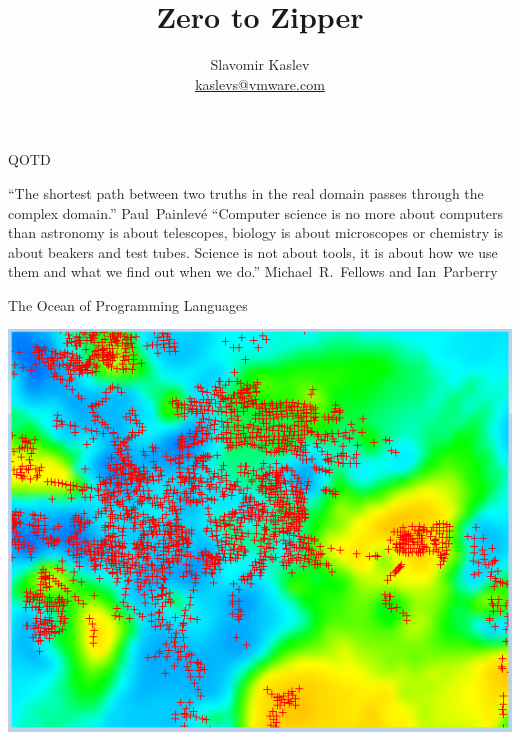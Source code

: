\documentclass[pdf]{beamer}
\title{Zero to Zipper}
\author{Slavomir Kaslev \\
  \href{mailto:kaslevs@vmware.com}{kaslevs@vmware.com}}
\begin{document}
\begin{frame}
  \titlepage
\end{frame}

\begin{frame}{QOTD}
  \begin{outline}
    \1 ``The shortest path between two truths in the real domain passes through the complex domain.'' \mbox{Paul Painlevé}
    \vspace{1cm}
    \1 ``Computer science is no more about computers than astronomy is about telescopes, biology is about microscopes or chemistry is about beakers and test tubes. Science is not about tools, it is about how we use them and what we find out when we do.'' \mbox{Michael R. Fellows} and \mbox{Ian Parberry}
  \end{outline}
\end{frame}


\begin{frame}{The Ocean of Programming Languages}
  \begin{center}
    \includegraphics[scale=0.7]{images/points}
  \end{center}
\end{frame}
\end{document}
